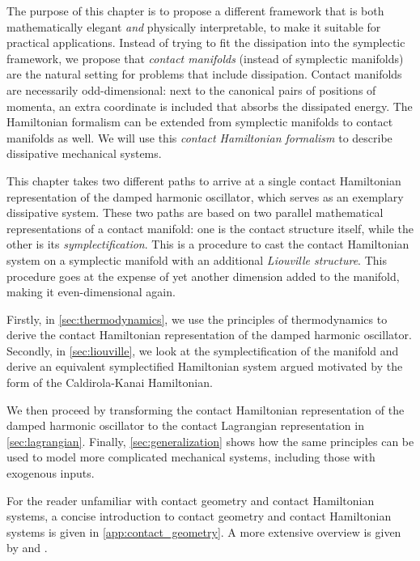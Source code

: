The purpose of this chapter is to propose a different framework that is both mathematically elegant \emph{and} physically interpretable, to make it suitable for practical applications. Instead of trying to fit the dissipation into the symplectic framework, we propose that \emph{contact manifolds} (instead of symplectic manifolds) are the natural setting for problems that include dissipation. Contact manifolds are necessarily odd-dimensional: next to the canonical pairs of positions of momenta, an extra coordinate is included that absorbs the dissipated energy. The Hamiltonian formalism can be extended from symplectic manifolds to contact manifolds as well. We will use this \emph{contact Hamiltonian formalism} to describe dissipative mechanical systems.

This chapter takes two different paths to arrive at a single contact Hamiltonian representation of the damped harmonic oscillator, which serves as an exemplary dissipative system. These two paths are based on two parallel mathematical representations of a contact manifold: one is the contact structure itself, while the other is its \emph{symplectification}. This is a procedure to cast the contact Hamiltonian system on a symplectic manifold with an additional \emph{Liouville structure}. This procedure goes at the expense of yet another dimension added to the manifold, making it even-dimensional again.

Firstly, in \cref{sec:thermodynamics}, we use the principles of thermodynamics to derive the contact Hamiltonian representation of the damped harmonic oscillator. Secondly, in \cref{sec:liouville}, we look at the symplectification of the manifold and derive an equivalent symplectified Hamiltonian system argued motivated by the form of the Caldirola-Kanai Hamiltonian.

We then proceed by transforming the contact Hamiltonian representation of the damped harmonic oscillator to the contact Lagrangian representation in \cref{sec:lagrangian}. Finally, \cref{sec:generalization} shows how the same principles can be used to model more complicated mechanical systems, including those with exogenous inputs.

For the reader unfamiliar with contact geometry and contact Hamiltonian systems, a concise introduction to contact geometry and contact Hamiltonian systems is given in \cref{app:contact_geometry}. A more extensive overview is given by \citet{Geiges2008} and \citet{Libermann1987}.






